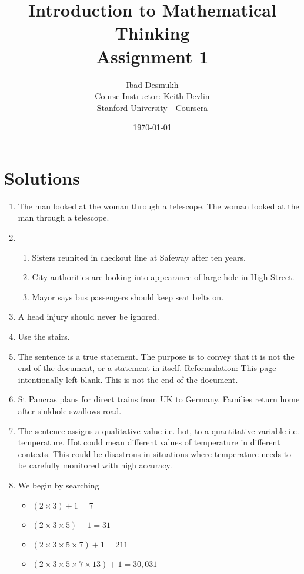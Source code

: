 \documentclass[11pt]{article}
\title{Introduction to Mathematical Thinking\\
       Assignment 1}
\author{Ibad Desmukh\\[1ex]
        \small Course Instructor: Keith Devlin\\
        \small Stanford University - Coursera}
\date{\today}
\begin{document}
\maketitle
\section*{Solutions}
\begin{enumerate}
    \item The man looked at the woman through a telescope. The woman looked at the man through a telescope.
    \item
        \begin{enumerate}[label=(\alph*)]
            \item Sisters reunited in checkout line at Safeway after ten years.
            \item City authorities are looking into appearance of large hole in High Street.
            \item Mayor says bus passengers should keep seat belts on.
        \end{enumerate}
    \item A head injury should never be ignored.
    \item Use the stairs.
    \item The sentence is a true statement. The purpose is to convey that it is not the end of the document, or a statement in itself. Reformulation: This page intentionally left blank. This is not the end of the document. 
    \item St Pancras plans for direct trains from UK to Germany.  Families return home after sinkhole swallows road. 
    \item The sentence assigns a qualitative value i.e. hot, to a quantitative variable i.e. temperature. Hot could mean different values of temperature in different contexts. This could be disastrous in situations where temperature needs to be carefully monitored with high accuracy.
    \item We begin by searching
        \begin{itemize}
            \item $(2 \times 3) + 1 = 7$
            \item $(2 \times 3 \times 5) + 1 = 31$
            \item $(2 \times 3 \times 5 \times 7) + 1 = 211$
            \item $(2 \times 3 \times 5 \times 7 \times 13) + 1 = 30,031$
        \end{itemize}
\end{enumerate}
\end{document}
